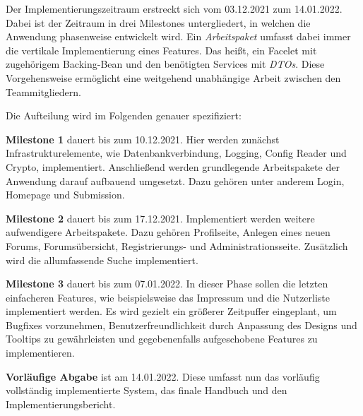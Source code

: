 
Der Implementierungszeitraum erstreckt sich vom 03.12.2021 zum 14.01.2022.
Dabei ist der Zeitraum in drei Milestones untergliedert, in welchen die Anwendung phasenweise entwickelt wird. Ein \emph{Arbeitspaket} umfasst dabei immer die vertikale Implementierung eines Features. Das heißt, ein Facelet mit zugehörigem Backing-Bean und den benötigten Services mit \emph{DTOs}. Diese Vorgehensweise ermöglicht eine weitgehend unabhängige Arbeit zwischen den Teammitgliedern.

Die Aufteilung wird im Folgenden genauer spezifiziert:

\begin{description}
	\item \textbf{Milestone 1} dauert bis zum 10.12.2021. Hier werden zunächst Infrastrukturelemente, wie Datenbankverbindung, Logging, Config Reader und Crypto, implementiert. Anschließend werden grundlegende Arbeitspakete der Anwendung darauf aufbauend umgesetzt. Dazu gehören unter anderem Login, Homepage und Submission.

	\item \textbf{Milestone 2} dauert bis zum 17.12.2021. Implementiert werden weitere aufwendigere Arbeitspakete. Dazu gehören Profilseite, Anlegen eines neuen Forums, Forumsübersicht, Registrierungs- und Administrationsseite. Zusätzlich wird die allumfassende Suche implementiert.

	\item \textbf{Milestone 3} dauert bis zum 07.01.2022. In dieser Phase sollen die letzten einfacheren Features, wie beispielsweise das Impressum und die Nutzerliste implementiert werden. Es wird gezielt ein größerer Zeitpuffer eingeplant, um Bugfixes vorzunehmen, Benutzerfreundlichkeit durch Anpassung des Designs und Tooltips zu gewährleisten und gegebenenfalls aufgeschobene Features zu implementieren.

	\item \textbf{Vorläufige Abgabe} ist am 14.01.2022. Diese umfasst nun das vorläufig vollständig implementierte System, das finale Handbuch und den Implementierungsbericht.
\end{description}
